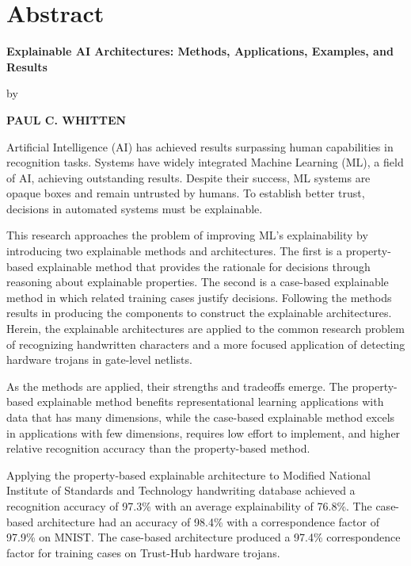 \chapter*{Abstract}{
\pagestyle{plain} %

\begin{center}
\large{\bfseries{Explainable AI Architectures: Methods, Applications, Examples, and Results}}

by

\bfseries\MakeUppercase{Paul C. Whitten}
\end{center}

Artificial Intelligence (AI) has achieved results surpassing human capabilities
in recognition tasks. Systems have widely integrated Machine Learning (ML), a
field of AI, achieving outstanding results. Despite their success, ML systems
are opaque boxes and remain untrusted by humans. To establish better trust,
decisions in automated systems must be explainable.

This research approaches the problem of improving ML's explainability by
introducing two explainable methods and architectures. The first is a
property-based explainable method that provides the rationale for decisions
through reasoning about explainable properties. The second is a case-based
explainable method in which related training cases justify decisions. Following
the methods results in producing the components to construct the explainable
architectures. Herein, the explainable architectures are applied to the common
research problem of recognizing handwritten characters and a more focused
application of detecting hardware trojans in gate-level netlists.

As the methods are applied, their strengths and tradeoffs emerge. The
property-based explainable method benefits representational learning
applications with data that has many dimensions, while the case-based
explainable method excels in applications with few dimensions, requires low
effort to implement, and higher relative recognition accuracy than the
property-based method.

Applying the property-based explainable architecture to Modified National
Institute of Standards and Technology handwriting database achieved a
recognition accuracy of 97.3\% with an average explainability of 76.8\%. The
case-based architecture had an accuracy of 98.4\% with a correspondence factor
of 97.9\% on MNIST. The case-based architecture produced a 97.4\% correspondence
factor for training cases on Trust-Hub hardware trojans.

}
